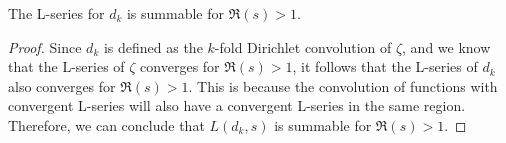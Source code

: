 \begin{theorem}
\label{LSeries_d_summable}
\leanok
The L-series for $d_k$ is summable for $\Re(s) > 1$.
\end{theorem}
\begin{proof}
\leanok
Since $d_k$ is defined as the $k$-fold Dirichlet convolution of $\zeta$, and we know that the L-series of $\zeta$ converges for $\Re(s) > 1$, it follows that the L-series of $d_k$ also converges for $\Re(s) > 1$. This is because the convolution of functions with convergent L-series will also have a convergent L-series in the same region. Therefore, we can conclude that $L(d_k, s)$ is summable for $\Re(s) > 1$.
\end{proof}
